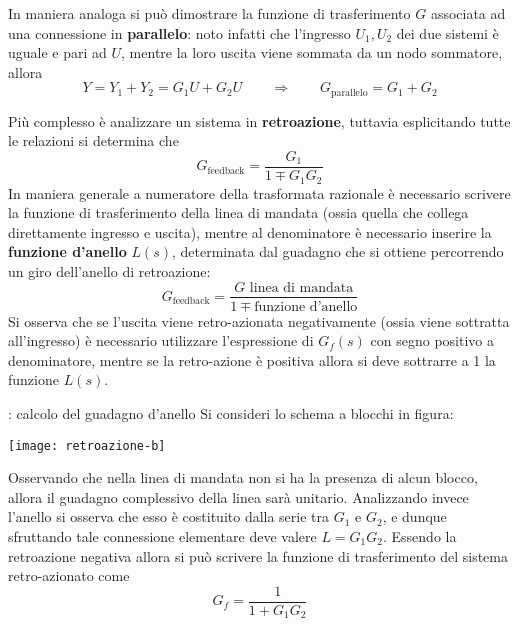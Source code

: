 		In maniera analoga si può dimostrare la funzione di trasferimento $G$ associata ad una connessione in \textbf{parallelo}: noto infatti che l'ingresso $U_1,U_2$ dei due sistemi è uguale e pari ad $U$, mentre la loro uscita viene sommata da un nodo sommatore, allora
		\[ Y = Y_1+Y_2 = G_1U+G_2U \qquad \Rightarrow\qquad G_\textrm{parallelo} = G_1+G_2 \]
		
		Più complesso è analizzare un sistema in \textbf{retroazione}, tuttavia esplicitando tutte le relazioni si determina che
		\[G_\textrm{feedback} = \frac{G_1}{1\mp G_1G_2}  \]
		In maniera generale a numeratore della trasformata razionale è necessario scrivere la funzione di trasferimento della linea di mandata (ossia quella che collega direttamente ingresso e uscita), mentre al denominatore è necessario inserire la \textbf{funzione d'anello} $L(s)$, determinata dal guadagno che si ottiene percorrendo un giro dell'anello di retroazione:
		\[  G_\textrm{feedback} = \frac{G \textrm{ linea di mandata}}{1 \mp \textrm{funzione d'anello}} \]
		Si osserva che se l'uscita viene retro-azionata negativamente (ossia viene sottratta all'ingresso) è necessario utilizzare l'espressione di $G_f(s)$ con segno positivo a denominatore, mentre se la retro-azione è positiva allora si deve sottrarre a 1 la funzione $L(s)$.
		
		\begin{esempio}{: calcolo del guadagno d'anello}
			Si consideri lo schema a blocchi in figura:
			\begin{center}
				\texttt{[image: retroazione-b]}
			\end{center}
			Osservando che nella linea di mandata non si ha la presenza di alcun blocco, allora il guadagno complessivo della linea sarà unitario. Analizzando invece l'anello si osserva che esso è costituito dalla serie tra $G_1$ e $G_2$, e dunque sfruttando tale connessione elementare deve valere $L = G_1G_2$. Essendo la retroazione negativa allora si può scrivere la funzione di trasferimento del sistema retro-azionato come
			\[ G_f = \frac 1 {1+G_1G_2} \]
		
		\end{esempio}
	
